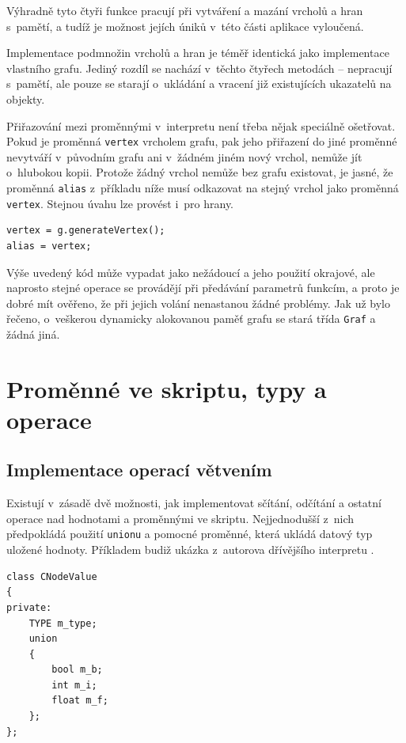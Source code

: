 \documentclass[11pt,twoside,a4paper]{book}
\begin{document}
Výhradně tyto čtyři funkce pracují při vytváření a mazání vrcholů a hran s~pamětí, a tudíž je možnost jejích úniků v~této části aplikace vyloučená.

Implementace podmnožin vrcholů a hran je téměř identická jako implementace vlastního grafu. Jediný rozdíl se nachází v~těchto čtyřech metodách -- nepracují s~pamětí, ale pouze se starají o~ukládání a vracení již existujících ukazatelů na objekty.

Přiřazování mezi proměnnými v~interpretu není třeba nějak speciálně ošetřovat. Pokud je proměnná \texttt{vertex} vrcholem grafu, pak jeho přiřazení do jiné proměnné nevytváří v~původním grafu ani v~žádném jiném nový vrchol, nemůže jít o~hlubokou kopii. Protože žádný vrchol nemůže bez grafu existovat, je jasné, že proměnná \texttt{alias} z~příkladu níže musí odkazovat na stejný vrchol  jako proměnná \texttt{vertex}. Stejnou úvahu lze provést i~pro hrany.

\begin{verbatim}
vertex = g.generateVertex();
alias = vertex;
\end{verbatim}

Výše uvedený kód může vypadat jako nežádoucí a jeho použití okrajové, ale naprosto stejné operace se provádějí při předávání parametrů funkcím, a proto je dobré mít ověřeno, že při jejich volání nenastanou žádné problémy. Jak už bylo řečeno, o~veškerou dynamicky alokovanou paměť grafu se stará třída \texttt{Graf} a žádná jiná.


\section{Proměnné ve skriptu, typy a operace}

\subsection{Implementace operací větvením}

Existují v~zásadě dvě možnosti, jak implementovat sčítání, odčítání a ostatní operace nad hodnotami a proměnnými ve skriptu. Nejjednodušší z~nich předpokládá použití \texttt{unionu} a pomocné proměnné, která ukládá datový typ uložené hodnoty. Příkladem budiž ukázka z~autorova dřívějšího interpretu \cite[třída \texttt{CNodeValue}]{borsch}.

\begin{verbatim}
class CNodeValue
{
private:
    TYPE m_type;
    union
    {
        bool m_b;
        int m_i;
        float m_f;
    };
};
\end{verbatim}
\end{document}
